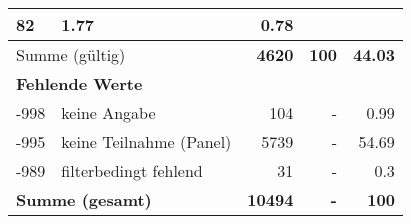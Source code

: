 \begin{longtable}{lXrrr}
       \num{82} &
       \num[round-mode=places,round-precision=2]{1.77} &
         \num[round-mode=places,round-precision=2]{0.78} \\
     \midrule
     \multicolumn{2}{l}{Summe (gültig)} &
       \textbf{\num{4620}} &
     \textbf{\num{100}} &
       \textbf{\num[round-mode=places,round-precision=2]{44.03}} \\
     \multicolumn{5}{l}{\textbf{Fehlende Werte}}\\
       -998 &
       keine Angabe &
         \num{104} &
        - &
         \num[round-mode=places,round-precision=2]{0.99} \\
       -995 &
       keine Teilnahme (Panel) &
         \num{5739} &
        - &
         \num[round-mode=places,round-precision=2]{54.69} \\
       -989 &
       filterbedingt fehlend &
         \num{31} &
        - &
         \num[round-mode=places,round-precision=2]{0.3} \\
     \midrule
     \multicolumn{2}{l}{\textbf{Summe (gesamt)}} &
          \textbf{\num{10494}} &
        \textbf{-} &
        \textbf{\num{100}} \\
     \bottomrule
     \end{longtable}
     
